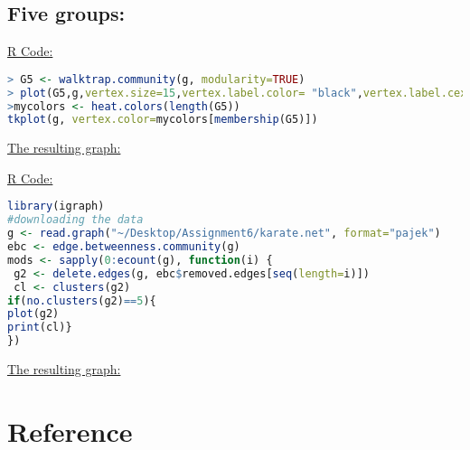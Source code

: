 \documentclass[letterpaper,11pt]{article}
\begin{document}
\subsection*{Five groups:}
\uline{R Code:}\\
\begin{lstlisting}[language=R,frame=single]
> G5 <- walktrap.community(g, modularity=TRUE)
> plot(G5,g,vertex.size=15,vertex.label.color= "black",vertex.label.cex=0.45,layout=layout.fruchterman.reingold)
>mycolors <- heat.colors(length(G5))
tkplot(g, vertex.color=mycolors[membership(G5)])
\end{lstlisting}
\uline{The resulting graph:}\\
\noindent
\begin{minipage}{\linewidth}
\label{visina8}
\end{minipage}
\newpage
\uline{R Code:}\\
\begin{lstlisting}[language=R,frame=single]
library(igraph)
#downloading the data
g <- read.graph("~/Desktop/Assignment6/karate.net", format="pajek")
ebc <- edge.betweenness.community(g)
mods <- sapply(0:ecount(g), function(i) {
 g2 <- delete.edges(g, ebc$removed.edges[seq(length=i)])
 cl <- clusters(g2)
if(no.clusters(g2)==5){
plot(g2)
print(cl)}
})
\end{lstlisting}
\uline{The resulting graph:}\\
\noindent
\begin{minipage}{\linewidth}
\label{visina8}
\end{minipage}

\newpage
\section*{Reference}
\end{document}
